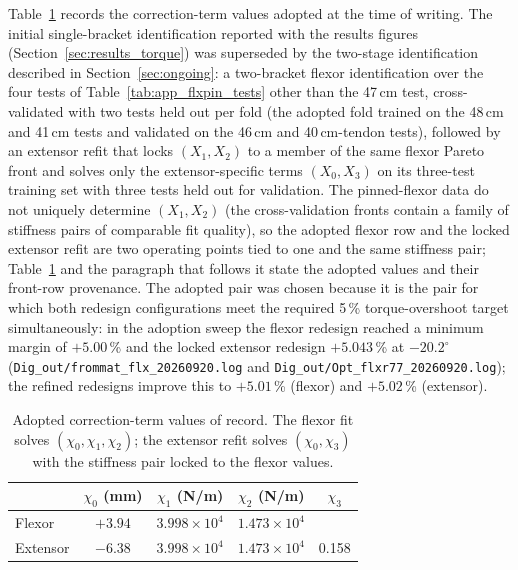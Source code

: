 Table~\ref{tab:app_xi_values} records the correction-term values adopted at the time of writing. The initial single-bracket identification reported with the results figures (Section~\ref{sec:results_torque}) was superseded by the two-stage identification described in Section~\ref{sec:ongoing}: a two-bracket flexor identification over the four tests of Table~\ref{tab:app_flxpin_tests} other than the 47\,cm test, cross-validated with two tests held out per fold (the adopted fold trained on the 48\,cm and 41\,cm tests and validated on the 46\,cm and 40\,cm-tendon tests), followed by an extensor refit that locks $(X_{1}, X_{2})$ to a member of the same flexor Pareto front and solves only the extensor-specific terms $(X_{0}, X_{3})$ on its three-test training set with three tests held out for validation. The pinned-flexor data do not uniquely determine $(X_{1}, X_{2})$ (the cross-validation fronts contain a family of stiffness pairs of comparable fit quality), so the adopted flexor row and the locked extensor refit are two operating points tied to one and the same stiffness pair; Table~\ref{tab:app_xi_values} and the paragraph that follows it state the adopted values and their front-row provenance. The adopted pair was chosen because it is the pair for which both redesign configurations meet the required 5\,\% torque-overshoot target simultaneously: in the adoption sweep the flexor redesign reached a minimum margin of $+5.00$\,\% and the locked extensor redesign $+5.043$\,\% at $-20.2^{\circ}$ (\texttt{Dig\_out/frommat\_flx\_20260920.log} and \texttt{Dig\_out/Opt\_flxr77\_20260920.log}); the refined redesigns improve this to $+5.01$\,\% (flexor) and $+5.02$\,\% (extensor).

\begin{table}[htbp]
\caption{Adopted correction-term values of record. The flexor fit solves $(\chi_{0}, \chi_{1}, \chi_{2})$; the extensor refit solves $(\chi_{0}, \chi_{3})$ with the stiffness pair locked to the flexor values.}
\label{tab:app_xi_values}
\begin{tabular}{@{}lcccc@{}}
\toprule
 & $\chi_{0}$ (mm) & $\chi_{1}$ (N/m) & $\chi_{2}$ (N/m) & $\chi_{3}$ \\
\midrule
Flexor   & $+3.94$ & $3.998\times10^{4}$ & $1.473\times10^{4}$ &  \\
Extensor & $-6.38$ & $3.998\times10^{4}$ & $1.473\times10^{4}$ & 0.158 \\
\bottomrule
\end{tabular}
\end{table}

